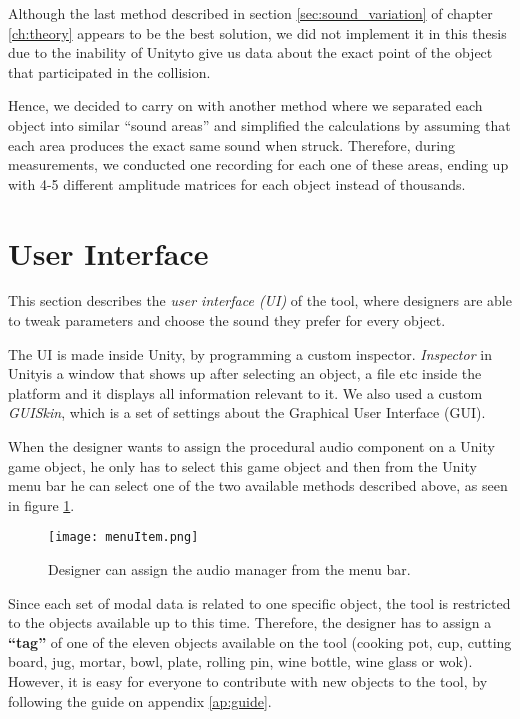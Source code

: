 Although the last method described in section \ref{sec:sound_variation} of chapter \ref{ch:theory} appears to be the best solution, we did not implement it in this thesis due to the inability of Unity\textregistered to give us data about the exact point of the object that participated in the collision.

Hence, we decided to carry on with another method where we separated each object into similar ``sound areas'' and simplified the calculations by assuming that each area produces the exact same sound when struck. Therefore, during measurements, we conducted one recording for each one of these areas, ending up with 4-5 different amplitude matrices for each object instead of thousands.

\section{User Interface}\label{sec:UI}
This section describes the \textit{user interface (UI)} of the tool, where designers are able to tweak parameters and choose the sound they prefer for every object.

The UI is made inside Unity\textregistered, by programming a custom inspector. \textit{Inspector} in Unity\textregistered is a window that shows up after selecting an object, a file etc inside the platform and it displays all information relevant to it. We also used a custom \textit{GUISkin}, which is a set of settings about the Graphical User Interface (GUI). 

When the designer wants to assign the procedural audio component on a Unity game object, he only has to select this game object and then from the Unity menu bar he can select one of the two available methods described above, as seen in figure \ref{fig:menu_item}.
\begin{figure}[H]
  \centering
    \texttt{[image: menuItem.png]}
      \caption{Designer can assign the audio manager from the menu bar.}
      \label{fig:menu_item}
\end{figure}

Since each set of modal data is related to one specific object, the tool is restricted to the objects available up to this time. Therefore, the designer has to assign a \textbf{``tag''} of one of the eleven objects available on the tool (cooking pot, cup, cutting board, jug, mortar, bowl, plate, rolling pin, wine bottle, wine glass or wok). However, it is easy for everyone to contribute with new objects to the tool, by following the guide on appendix \ref{ap:guide}.

